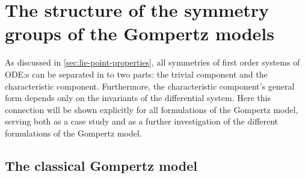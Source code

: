 \section{The structure of the symmetry groups of the Gompertz models}

As discussed in \cref{sec:lie-point-properties}, all symmetries of first order systems of ODE:s can be separated in to two parts: the trivial component and the characteristic component.
Furthermore, the characteristic component's general form depends only on the invariants of the differential system.
Here this connection will be shown explicitly for all formulations of the Gompertz model, serving both as a case study and as a further investigation of the different formulations of the Gompertz model.

\subsection{The classical Gompertz model}

